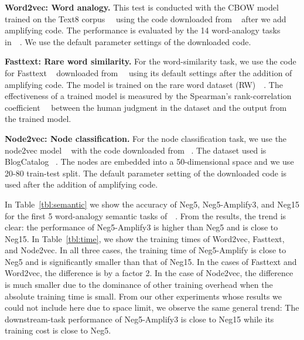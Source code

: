 \textbf{Word2vec: Word analogy.} This test is conducted with the CBOW model trained on the Text8 corpus~~\citep{mikolov2013distributed} using the code downloaded from ~\citep{word2vecGithub} after we add amplifying code. The performance is evaluated by the 14 word-analogy tasks in~~\citep{mikolov2013distributed}. We use the default parameter settings of the downloaded code.

\textbf{Fasttext: Rare word similarity.}
For the word-similarity task, we use the code for Fasttext ~\citep{fastText} downloaded from~~\citep{fastTextGithub} using its default settings after the addition of amplifying code. The model is trained on the rare word dataset (RW)~~\citep{luong2013better}. The effectiveness of a trained model is measured by the Spearman’s rank-correlation coefficient~~\citep{spearman1904proof} between the human judgment in the dataset and the output from the trained model.

\textbf{Node2vec: Node classification.} For the node classification task, we use the node2vec model ~\citep{node2vec-kdd2016} with the code downloaded from ~\citep{node2vecGithub}. The dataset used is BlogCatalog ~\citep{Zafarani+Liu:2009}. The nodes are embedded into a 50-dimensional space and we use 20-80 train-test split. The default parameter setting of the downloaded code is used after the addition of amplifying code.   

In Table~\ref{tbl:semantic} we show the accuracy of Neg5, Neg5-Amplify3, and Neg15 for the first 5 word-analogy semantic tasks of~~\citep{mikolov2013distributed}. From the results, the trend is clear: the performance of Neg5-Amplify3 is higher than Neg5 and is close to Neg15. In Table~\ref{tbl:time}, we show the training times of Word2vec, Fasttext, and Node2vec. In all three cases, the training time of Neg5-Amplify is close to Neg5 and is significantly smaller than that of Neg15. In the cases of Fasttext and Word2vec, the difference is by a factor 2. In the case of Node2vec, the difference is much smaller due to the dominance of other training overhead when the absolute training time is small.
From our other experiments whose results we could not include here due to space limit, we observe the same general trend: The downstream-task performance of Neg5-Amplify3 is close to Neg15 while its training cost is close to Neg5. 

